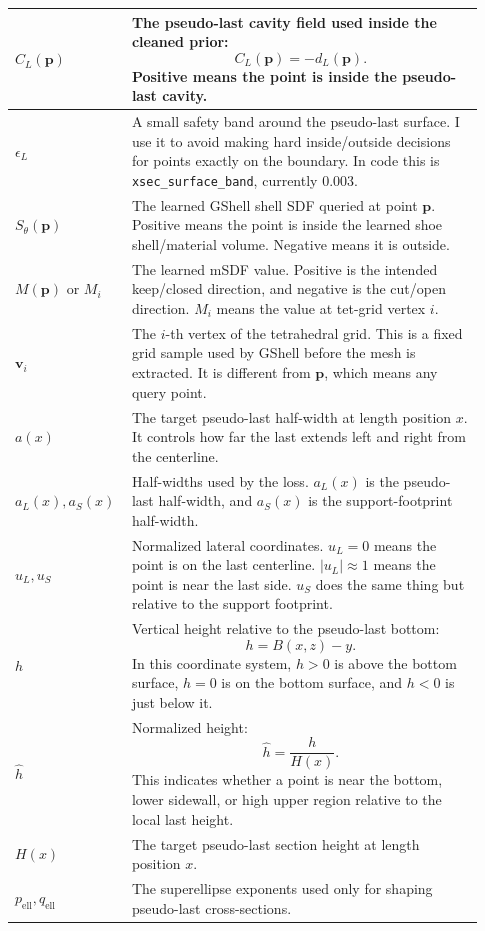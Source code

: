 \documentclass[11pt]{article}
\newcommand{\pt}{\mathbf{p}}
\newcommand{\vtx}{\mathbf{v}}
\begin{document}
\begin{longtable}{p{0.20\linewidth}p{0.73\linewidth}}
\(C_L(\pt)\) &
The pseudo-last cavity field used inside the cleaned prior:
\[
C_L(\pt)=-d_L(\pt).
\]
Positive means the point is inside the pseudo-last cavity. \\
\midrule
\(\epsilon_L\) &
A small safety band around the pseudo-last surface.  I use it to avoid making
hard inside/outside decisions for points exactly on the boundary.  In code this
is \texttt{xsec\_surface\_band}, currently \(0.003\). \\
\midrule
\(S_\theta(\pt)\) &
The learned GShell shell SDF queried at point \(\pt\).  Positive means the
point is inside the learned shoe shell/material volume.  Negative means it is
outside. \\
\midrule
\(M(\pt)\) or \(M_i\) &
The learned mSDF value.  Positive is the intended keep/closed direction, and
negative is the cut/open direction.  \(M_i\) means the value at tet-grid vertex
\(i\). \\
\midrule
\(\vtx_i\) &
The \(i\)-th vertex of the tetrahedral grid.  This is a fixed grid sample used
by GShell before the mesh is extracted.  It is different from \(\pt\), which
means any query point. \\
\midrule
\(a(x)\) &
The target pseudo-last half-width at length position \(x\).  It controls how
far the last extends left and right from the centerline. \\
\midrule
\(a_L(x),a_S(x)\) &
Half-widths used by the loss.  \(a_L(x)\) is the pseudo-last half-width, and
\(a_S(x)\) is the support-footprint half-width. \\
\midrule
\(u_L,u_S\) &
Normalized lateral coordinates.  \(u_L=0\) means the point is on the last
centerline.  \(|u_L|\approx 1\) means the point is near the last side.  \(u_S\)
does the same thing but relative to the support footprint. \\
\midrule
\(h\) &
Vertical height relative to the pseudo-last bottom:
\[
h=B(x,z)-y.
\]
In this coordinate system, \(h>0\) is above the bottom surface, \(h=0\) is on
the bottom surface, and \(h<0\) is just below it. \\
\midrule
\(\hat{h}\) &
Normalized height:
\[
\hat{h}=\frac{h}{H(x)}.
\]
This indicates whether a point is near the bottom, lower sidewall, or high upper
region relative to the local last height. \\
\midrule
\(H(x)\) &
The target pseudo-last section height at length position \(x\). \\
\midrule
\(p_{\mathrm{ell}},q_{\mathrm{ell}}\) &
The superellipse exponents used only for shaping pseudo-last cross-sections.

\end{longtable}
\end{document}
